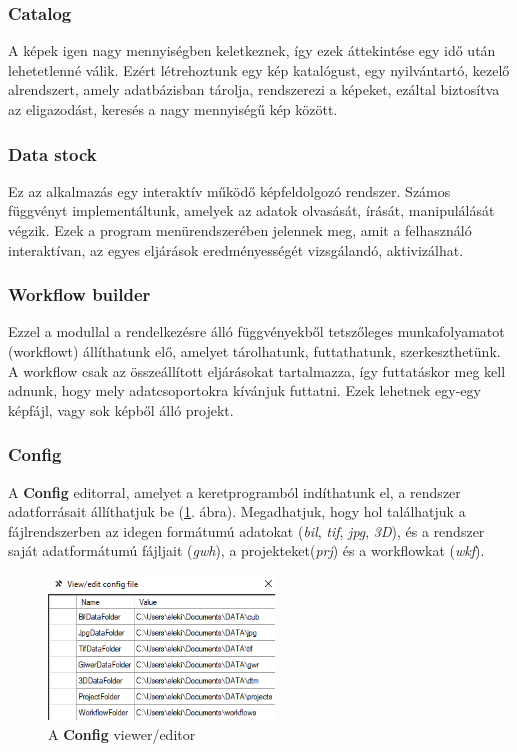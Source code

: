 \documentclass[a4paper,12pt]{article}
\begin{document}
\subsubsection{Catalog}

A képek igen nagy mennyiségben keletkeznek, így ezek áttekintése egy idő után lehetetlenné válik. Ezért létrehoztunk egy kép katalógust, egy nyilvántartó, kezelő alrendszert, amely adatbázisban tárolja, rendszerezi a képeket, ezáltal biztosítva az eligazodást, keresés a nagy mennyiségű kép között.

\subsubsection{Data stock}

Ez az alkalmazás egy interaktív működő képfeldolgozó rendszer. Számos függvényt implementáltunk, amelyek az adatok olvasását, írását, manipulálását végzik. Ezek a program menürendszerében jelennek meg, amit a felhasználó interaktívan, az egyes eljárások eredményességét vizsgálandó, aktivizálhat.


\subsubsection{Workflow builder}

Ezzel a modullal a rendelkezésre álló függvényekből tetszőleges munkafolyamatot (workflowt) állíthatunk elő, amelyet tárolhatunk, futtathatunk, szerkeszthetünk. A workflow csak az összeállított eljárásokat tartalmazza, így futtatáskor meg kell adnunk, hogy mely adatcsoportokra kívánjuk futtatni. Ezek lehetnek egy-egy képfájl, vagy sok képből álló projekt.


\subsubsection{Config}

A \textbf{Config} editorral, amelyet a keretprogramból indíthatunk el, a rendszer adatforrásait állíthatjuk be (\ref{fig:config}. ábra). Megadhatjuk, hogy hol találhatjuk a fájlrendszerben az idegen formátumú adatokat (\textit{bil}, \textit{tif}, \textit{jpg}, \textit{3D}), és a rendszer saját adatformátumú fájljait (\textit{gwh}), a projekteket(\textit{prj}) és a workflowkat (\textit{wkf}). 
 
 \begin{figure}[h]
 	\centering
 	\includegraphics[width=6cm]{config.png}
 	\caption{A \textbf{Config} viewer/editor}
 	\label{fig:config}
 \end{figure}
 
\end{document}
